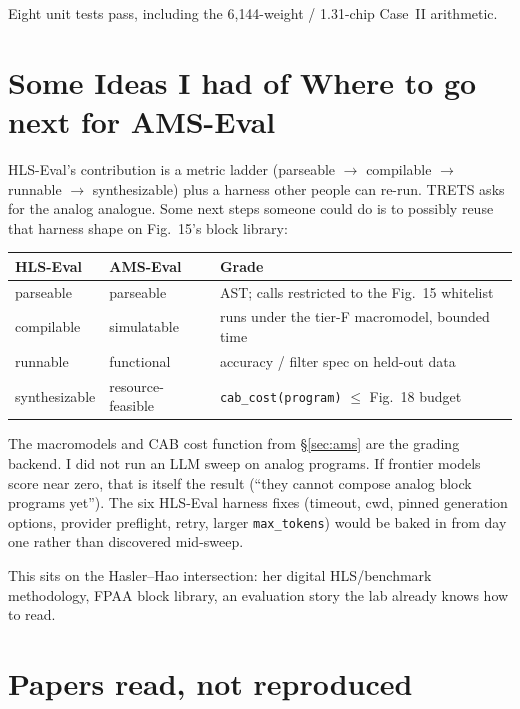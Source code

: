 \documentclass[11pt]{article}
\newcommand{\code}[1]{\texttt{#1}}
\begin{document}
Eight unit tests pass, including the 6{,}144-weight / 1.31-chip Case~II
arithmetic.

\section{Some Ideas I had of Where to go next for AMS-Eval}
\label{sec:amseval}

HLS-Eval's contribution is a metric ladder (parseable $\to$ compilable
$\to$ runnable $\to$ synthesizable) plus a harness other people can
re-run. TRETS asks for the analog analogue. Some next steps someone could do is to possibly reuse that harness shape on Fig.~15's block library:

\begin{center}
\small
\begin{tabular}{@{}lll@{}}
\toprule
\textbf{HLS-Eval} & \textbf{AMS-Eval} & \textbf{Grade} \\
\midrule
parseable & parseable & AST; calls restricted to the Fig.~15 whitelist \\
compilable & simulatable & runs under the tier-F macromodel, bounded time \\
runnable & functional & accuracy / filter spec on held-out data \\
synthesizable & resource-feasible & \code{cab\_cost(program)} $\le$ Fig.~18 budget \\
\bottomrule
\end{tabular}
\end{center}

The macromodels and CAB cost function from \S\ref{sec:ams} are the
grading backend. I did not run an LLM sweep on analog programs. If
frontier models score near zero, that is itself the result (``they
cannot compose analog block programs yet''). The six HLS-Eval harness
fixes (timeout, cwd, pinned generation options, provider preflight,
retry, larger \code{max\_tokens}) would be baked in from day one rather
than discovered mid-sweep.

This sits on the Hasler--Hao intersection: her digital HLS/benchmark
methodology, FPAA block library, an evaluation story the lab
already knows how to read.

\section{Papers read, not reproduced}
\label{sec:other}
\end{document}
